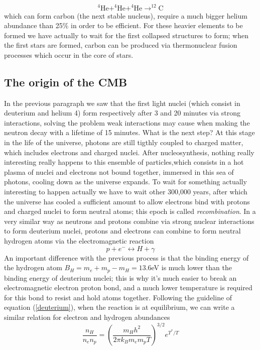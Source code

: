 \documentclass[11pt, a4paper,oneside,openright]{book}
\numberwithin{equation}{section}
\begin{document}
\begin{equation}
^4\mathrm{He} + ^4\mathrm{He} +^4\mathrm{He} \rightarrow ^{12}\mathrm{C}
\end{equation}
which can form carbon (the next stable nucleus), require a much bigger helium abundance than 25\% in order to be efficient. For these heavier elements to be formed we have actually to wait for the first collapsed structures to form; when the first stars are formed, carbon can be produced via thermonuclear fusion processes which occur in the core of stars. 
\subsection{The origin of the CMB}
In the previous paragraph we saw that the first light nuclei (which consist in deuterium and helium 4) form respectively after 3 and 20 minutes via strong interactions, solving the problem weak interactions may cause when making the neutron decay with a lifetime of 15 minutes. What is the next step? At this stage in the life of the universe, photons are still tigthly coupled to charged matter, which includes electrons and charged nuclei. After nucleosynthesis, nothing really interesting really happens to this ensemble of particles,which consists in a hot plasma of nuclei and electrons not bound together, immersed in this sea of photons, cooling down as the universe expands. To wait for something actually interesting to happen actually we have to wait other 300,000 years, after which the universe has cooled a sufficient amount to allow electrons bind with protons and charged nuclei to form neutral atoms; this epoch is called \textit{recombination}. In a very similar way as neutrons and protons combine via 
strong nuclear interactions to form deuterium nuclei, protons and electrons can combine to form neutral hydrogen atoms via the electromagnetic reaction
\begin{equation}
p+e^-\leftrightarrow H + \gamma
\end{equation}
An important difference with the previous process is that the binding energy of the hydrogen atom $B_H=m_e+m_p-m_H=13.6$eV is much lower than the binding energy of deuterium nuclei; this is why it's much easier to break an electromagnetic electron proton bond, and a much lower temperature is required for this bond to resist and hold atoms together. Following the guideline of equation (\ref{deuterium}), when the reaction is at equilibrium, we can write a similar relation for electron and hydrogen abundances
\begin{equation}
\frac{n_H}{n_en_p}=\left(\frac{m_Hh^2}{2\pi k_Bm_em_p T}\right)^{3/2}e^{T^*/T}
\end{equation}
\end{document}
